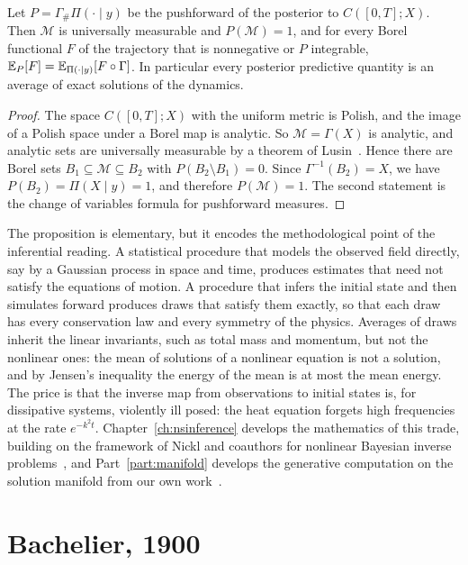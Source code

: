 \begin{proposition}
\label{prop:solution_manifold}
Let $P = \Gamma_\#\Pi(\cdot\mid y)$ be the pushforward of the posterior to $C([0,T];X)$. Then $\mathcal{M}$ is universally measurable and $P(\mathcal{M}) = 1$, and for every Borel functional $F$ of the trajectory that is nonnegative or $P$ integrable, $\mathbb{E}_P[F] = \mathbb{E}_{\Pi(\cdot\mid y)}[F\circ\Gamma]$. In particular every posterior predictive quantity is an average of exact solutions of the dynamics.
\end{proposition}

\begin{proof}
The space $C([0,T];X)$ with the uniform metric is Polish, and the image of a Polish space under a Borel map is analytic. So $\mathcal{M} = \Gamma(X)$ is analytic, and analytic sets are universally measurable by a theorem of Lusin~\cite{kechris1995}. Hence there are Borel sets $B_1\subseteq\mathcal{M}\subseteq B_2$ with $P(B_2\setminus B_1) = 0$. Since $\Gamma^{-1}(B_2) = X$, we have $P(B_2) = \Pi(X\mid y) = 1$, and therefore $P(\mathcal{M}) = 1$. The second statement is the change of variables formula for pushforward measures.
\end{proof}

The proposition is elementary, but it encodes the methodological point of the inferential reading. A statistical procedure that models the observed field directly, say by a Gaussian process in space and time, produces estimates that need not satisfy the equations of motion. A procedure that infers the initial state and then simulates forward produces draws that satisfy them exactly, so that each draw has every conservation law and every symmetry of the physics. Averages of draws inherit the linear invariants, such as total mass and momentum, but not the nonlinear ones: the mean of solutions of a nonlinear equation is not a solution, and by Jensen's inequality the energy of the mean is at most the mean energy. The price is that the inverse map from observations to initial states is, for dissipative systems, violently ill posed: the heat equation forgets high frequencies at the rate $e^{-k^2 t}$. Chapter~\ref{ch:nsinference} develops the mathematics of this trade, building on the framework of Nickl and coauthors for nonlinear Bayesian inverse problems~\cite{nickl2023book}, and Part~\ref{part:manifold} develops the generative computation on the solution manifold from our own work~\cite{polsonsokolov2026manifold}.

\section{Bachelier, 1900}

